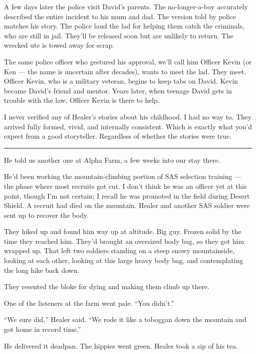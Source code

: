 A few days later the police visit David's parents.  The no-longer-a-boy accurately described the entire incident to his mum and dad.  The version told by police matches his story.  The police laud the lad for helping them catch the criminals, who are still in jail. They'll be released soon but are unlikely to return. The wrecked ute is towed away for scrap.

The same police officer who gestured his approval, we'll call him Officer Kevin (or Ken --- the name is uncertain after decades), wants to meet the lad.  They meet.  Officer Kevin, who is a military veteran, begins to keep tabs on David.  Kevin became David's friend and mentor.  Years later, when teenage David gets in trouble with the law, Officer Kevin is there to help.

I never verified any of Healer's stories about his childhood. I had no way to. They arrived fully formed, vivid, and internally consistent. Which is exactly what you'd expect from a good storyteller. Regardless of whether the stories were true.

\vspace{1cm}\noindent\rule{0.5\textwidth}{0.5pt}\vspace{0.5cm}

He told us another one at Alpha Farm, a few weeks into our stay there.

He'd been working the mountain-climbing portion of SAS selection training --- the phase where most recruits got cut. I don't think he was an officer yet at this point, though I'm not certain; I recall he was promoted in the field during Desert Shield. A recruit had died on the mountain. Healer and another SAS soldier were sent up to recover the body.

They hiked up and found him way up at altitude. Big guy. Frozen solid by the time they reached him. They'd brought an oversized body bag, so they got him wrapped up. That left two soldiers standing on a steep snowy mountainside, looking at each other, looking at this large heavy body bag, and contemplating the long hike back down.

They resented the bloke for dying and making them climb up there.

One of the listeners at the farm went pale. ``You didn't.''

``We sure did,'' Healer said. ``We rode it like a toboggan down the mountain and got home in record time.''

He delivered it deadpan. The hippies went green. Healer took a sip of his tea.

